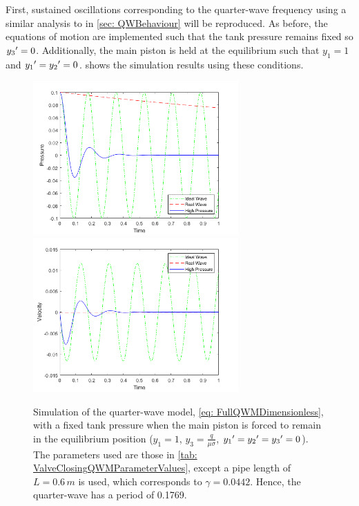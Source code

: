 First, %
sustained oscillations corresponding to the quarter-wave frequency using a similar analysis to in \cref{sec: QWBehaviour} will be reproduced. As before, the equations of motion are implemented such that the tank pressure remains fixed so $y_3{'} = 0$. Additionally, the main piston is held at the equilibrium such that $y_1 = 1$ and $y_1{'} = y_2{'} = 0$.  shows the simulation results using these conditions.
~
\begin{figure}[!ht]
    \centering
    \includegraphics[width=0.7\textwidth]{Figures/QWMSimulation/QWMBehaviourB.png}
    \includegraphics[width=0.7\textwidth]{Figures/QWMSimulation/QWMBehaviourC.png}
    \caption{Simulation of the quarter-wave model, \cref{eq: FullQWMDimensionless}, with a fixed tank pressure when the main piston is forced to remain in the equilibrium position ($y_1 = 1$, $y_3 = \frac{q}{\mu \sigma}$, $y_1{'}=y_2{'}=y_3{'}=0$). The parameters used are those in \cref{tab: ValveClosingQWMParameterValues}, except a pipe length of $L = 0.6 \, \si{m}$ is used, which corresponds to $\gamma = 0.0442$. Hence, the quarter-wave has a period of 0.1769.}
    \label{fig: QWMBehaviour}
\end{figure}

